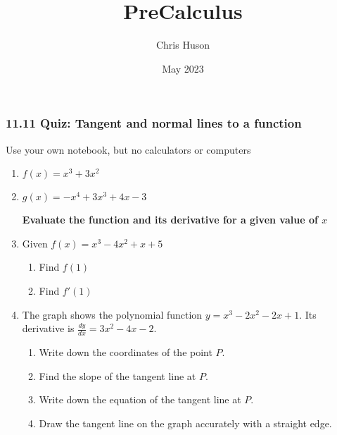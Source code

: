 \documentclass[12pt, twoside]{article}
\title{PreCalculus}
\author{Chris Huson}
\date{May 2023}
\begin{document}
\subsubsection*{11.11 Quiz: Tangent and normal lines to a function}
Use your own notebook, but no calculators or computers

\begin{enumerate}

\subsubsection*{Find the derivative of each polynomial function}
\item $f(x)=x^3+3x^2$ \vspace{3cm}
\item $g(x)=-x^4+3x^3+4x-3$ \par \vspace{3cm}

\textbf{Evaluate the function and its derivative for a given value of $x$}
\item Given $f(x)=x^3-4x^2+x+5$
\begin{enumerate}[itemsep=3cm]
    \item Find $f(1)$
    \item Find $f'(1)$
\end{enumerate} \vspace{2cm}

\newpage
\item The graph shows the polynomial function $\displaystyle y=x^3-2x^2-2x+1$. Its derivative is $\displaystyle \frac{dy}{dx}=3x^2-4x-2$. 
\begin{multicols}{2}
    \begin{enumerate}[itemsep=1cm]
        \item Write down the coordinates of the point $P$.
        \item Find the slope of the tangent line at $P$.
        \item Write down the equation of the tangent line at $P$.
        \item Draw the tangent line on the graph accurately with a straight edge.
    \end{enumerate}
        \begin{center}
    \end{center}
\end{multicols}


\end{enumerate}
\end{document}
